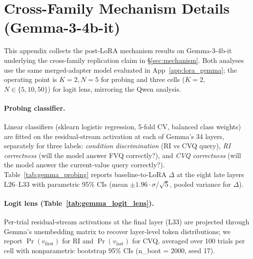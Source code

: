 \documentclass[11pt]{article}
\begin{document}
\section{Cross-Family Mechanism Details (Gemma-3-4b-it)}
\label{app:mechanism_gemma}

This appendix collects the post-LoRA mechanism results on
Gemma-3-4b-it underlying the cross-family replication claim in
\S\ref{sec:mechanism}. Both analyses use the same merged-adapter
model evaluated in App~\ref{app:lora_gemma}; the operating point is
$K{=}2, N{=}5$ for probing and three cells ($K{=}2$, $N \in
\{5, 10, 50\}$) for logit lens, mirroring the Qwen analysis.

\paragraph{Probing classifier.}
Linear classifiers (sklearn logistic regression, 5-fold CV, balanced
class weights) are fitted on the residual-stream activation at each
of Gemma's 34 layers, separately for three labels: \emph{condition
discrimination} (RI vs CVQ query), \emph{RI correctness} (will the
model answer FVQ correctly?), and \emph{CVQ correctness} (will the
model answer the current-value query correctly?).
Table~\ref{tab:gemma_probing} reports baseline-to-LoRA $\Delta$ at
the eight late layers L26--L33 with parametric 95\% CIs
(mean $\pm 1.96 \cdot \sigma / \sqrt{5}$, pooled variance for
$\Delta$).

\begin{table}[t]
\centering
\footnotesize
\setlength{\tabcolsep}{3pt}

\caption{Gemma-3-4b-it: $\Delta$ (LoRA $-$ base) in probing accuracy
across late layers, with 95\% CIs. Bold entries exclude zero. The
condition-discrimination probe saturates pre-LoRA in both
architectures. RI-correctness is broadly unchanged. CVQ-correctness
$\Delta$ is positive and statistically distinguishable from zero at
all eight late layers, mirroring the Qwen result of
Table~\ref{tab:mechanism}.}
\label{tab:gemma_probing}
\end{table}

\paragraph{Logit lens (Table~\ref{tab:gemma_logit_lens}).}
Per-trial residual-stream activations at the final layer (L33) are
projected through Gemma's unembedding matrix to recover layer-level
token distributions; we report $\Pr(v_{\mathrm{first}})$ for RI and
$\Pr(v_{\mathrm{last}})$ for CVQ, averaged over 100 trials per cell
with nonparametric bootstrap 95\% CIs (n\_boot = 2000, seed 17).
\end{document}
